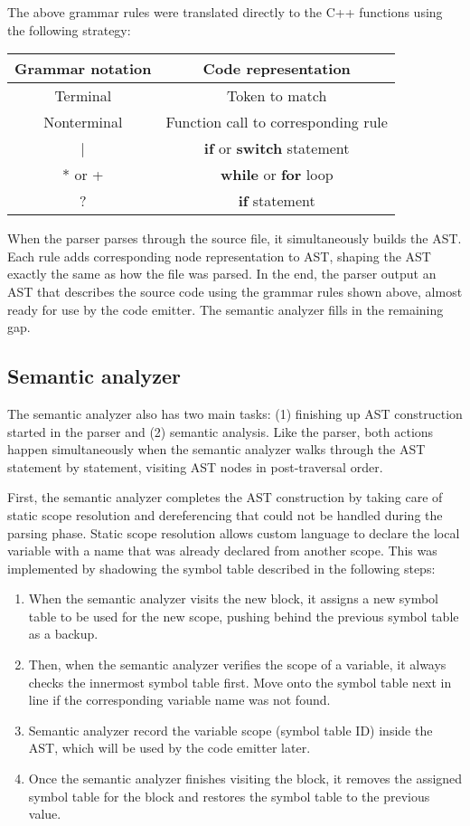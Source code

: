 \documentclass[manuscript,screen,nonacm]{acmart}
\begin{document}
The above grammar rules were translated directly to the C++ functions using the following strategy:

\begin{center}
\begin{tabular}{|c|c|}
    \hline
    Grammar notation & Code representation \\
    \hline
    Terminal & Token to match \\
    Nonterminal & Function call to corresponding rule \\
    | & \textbf{if} or \textbf{switch} statement \\
    * or + & \textbf{while} or \textbf{for} loop \\
    ? & \textbf{if} statement \\
    \hline
\end{tabular}
\end{center}

When the parser parses through the source file, it simultaneously builds the AST. Each rule adds corresponding node representation to AST, shaping the AST exactly the same as how the file was parsed. In the end, the parser output an AST that describes the source code using the grammar rules shown above, almost ready for use by the code emitter. The semantic analyzer fills in the remaining gap.


\subsection{Semantic analyzer}
The semantic analyzer also has two main tasks: (1) finishing up AST construction started in the parser and (2) semantic analysis. Like the parser, both actions happen simultaneously when the semantic analyzer walks through the AST statement by statement, visiting AST nodes in post-traversal order. 

First, the semantic analyzer completes the AST construction by taking care of static scope resolution and dereferencing that could not be handled during the parsing phase. Static scope resolution allows custom language to declare the local variable with a name that was already declared from another scope. This was implemented by shadowing the symbol table described in the following steps:
\begin{enumerate}
    \item When the semantic analyzer visits the new block, it assigns a new symbol table to be used for the new scope, pushing behind the previous symbol table as a backup.
    \item Then, when the semantic analyzer verifies the scope of a variable, it always checks the innermost symbol table first. Move onto the symbol table next in line if the corresponding variable name was not found.
    \item Semantic analyzer record the variable scope (symbol table ID) inside the AST, which will be used by the code emitter later.
    \item Once the semantic analyzer finishes visiting the block, it removes the assigned symbol table for the block and restores the symbol table to the previous value. 
\end{enumerate}
\end{document}
